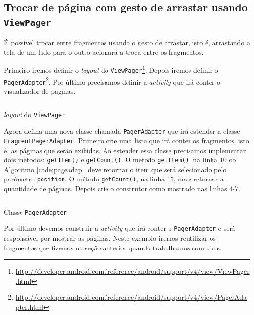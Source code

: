 \documentclass[a4paper,12pt,brazil,oneside]{book}
\begin{document}
\begin{singlespace}
	
\section{Trocar de página com gesto de arrastar usando \texttt{ViewPager}}

	É possível trocar entre fragmentos usando o gesto de arrastar, isto é, arrastando a tela de um lado para o outro acionará a troca entre os fragmentos. 
	
	Primeiro iremos definir o \emph{layout} do \texttt{ViewPager}\footnote{\href{http://developer.android.com/reference/android/support/v4/view/ViewPager.html}{http://developer.android.com/reference/android/support/v4/view/ViewPager.html}}. Depois iremos definir o \texttt{PagerAdapter}\footnote{\href{http://developer.android.com/reference/android/support/v4/view/PagerAdapter.html}{http://developer.android.com/reference/android/support/v4/view/PagerAdapter.html}}. Por último precisamos definir a \emph{activity} que irá conter o visualizador de páginas. 
	
	\begin{listing}[H]
	\inputminted[linenos=true,fontsize=\small,frame=lines, framesep=2mm, tabsize=2,numbersep=5pt]{xml}{src/design/viewpager.xml}
	\caption{\emph{layout} do \texttt{ViewPager}}
	\end{listing}
	
	Agora defina uma nova classe chamada \texttt{PagerAdapter} que irá estender a classe \\ \texttt{FragmentPagerAdapter}. Primeiro crie uma lista que irá conter os fragmentos, isto é, as páginas que serão exibidas. Ao estender essa classe precisamos implementar dois métodos: \texttt{getItem()} e \texttt{getCount()}. O método \texttt{getItem()}, na linha 10 do \hyperref[code:pageadap]{Algoritmo \ref*{code:pageadap}}, deve retornar o item que será selecionado pelo parâmetro \texttt{position}. O método \texttt{getCount()}, na linha 15, deve retornar a quantidade de páginas. Depois crie o construtor como mostrado nas linhas 4-7. 

	\begin{listing}[H]
	\inputminted[linenos=true,fontsize=\small,frame=lines, framesep=2mm, tabsize=2,numbersep=5pt]{java}{src/design/pageradapter.java}
	\caption{Classe \texttt{PagerAdapter}}
	\label{code:pageadap}
	\end{listing}
	
	Por último devemos construir a \emph{activity} que irá conter o \texttt{PagerAdapter} e será responsável por mostrar as páginas. Neste exemplo iremos reutilizar os fragmentos que fizemos na seção anterior quando trabalhamos com abas.
	

\end{singlespace}
\end{document}
